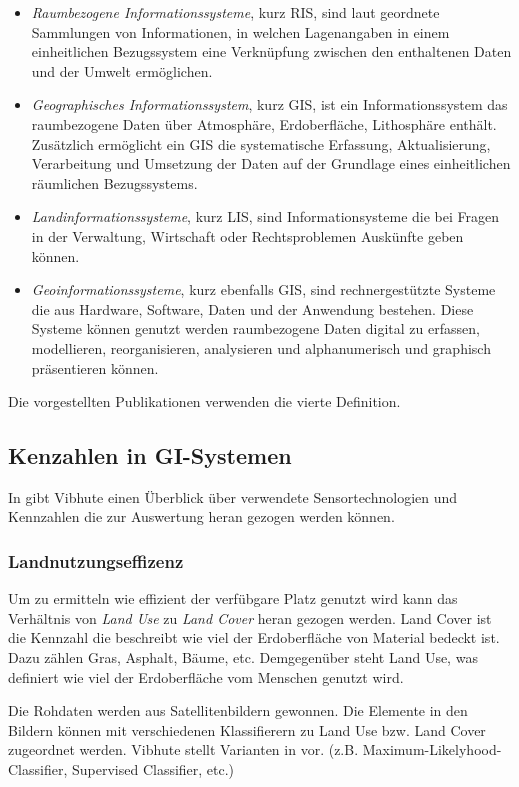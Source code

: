 \begin{itemize}
	\item \textit{Raumbezogene Informationssysteme}, kurz RIS, sind laut \cite{book:Cariosio2006} geordnete Sammlungen von Informationen, in welchen Lagenangaben in einem einheitlichen Bezugssystem eine Verknüpfung zwischen den enthaltenen Daten und der Umwelt ermöglichen.
	\item \textit{Geographisches Informationssystem}, kurz GIS, ist ein Informationssystem das raumbezogene Daten über Atmosphäre, Erdoberfläche, Lithosphäre enthält. Zusätzlich ermöglicht ein GIS die systematische Erfassung, Aktualisierung, Verarbeitung und Umsetzung der Daten auf der Grundlage eines einheitlichen räumlichen Bezugssystems.
	\item \textit{Landinformationssysteme}, kurz LIS, sind Informationsysteme die bei Fragen in der Verwaltung, Wirtschaft oder Rechtsproblemen Auskünfte geben können. 
	\item \textit{Geoinformationssysteme}, kurz ebenfalls GIS, sind rechnergestützte Systeme die aus Hardware, Software, Daten und der Anwendung bestehen. Diese Systeme können genutzt werden raumbezogene Daten digital zu erfassen, modellieren, reorganisieren, analysieren und alphanumerisch und graphisch präsentieren können.
\end{itemize}

Die vorgestellten Publikationen verwenden die vierte Definition.

\subsection{Kenzahlen in GI-Systemen}
In \cite{jour:Vibhute2013} gibt Vibhute einen Überblick über verwendete Sensortechnologien und Kennzahlen die zur Auswertung heran gezogen werden können.  

\subsubsection{Landnutzungseffizenz}

Um zu ermitteln wie effizient der verfübgare Platz genutzt wird kann das Verhältnis von \textit{Land Use} zu \textit{Land Cover} heran gezogen werden. Land Cover ist die Kennzahl die beschreibt wie viel der Erdoberfläche von Material bedeckt ist. Dazu zählen Gras, Asphalt, Bäume, etc. Demgegenüber steht Land Use, was definiert wie viel der Erdoberfläche vom Menschen genutzt wird.

Die Rohdaten werden aus Satellitenbildern gewonnen. Die Elemente in den Bildern können mit verschiedenen Klassifierern zu Land Use bzw. Land Cover zugeordnet werden. Vibhute stellt Varianten in \cite{jour:Vibhute2013} vor. (z.B. Maximum-Likelyhood-Classifier, Supervised Classifier, etc.)

